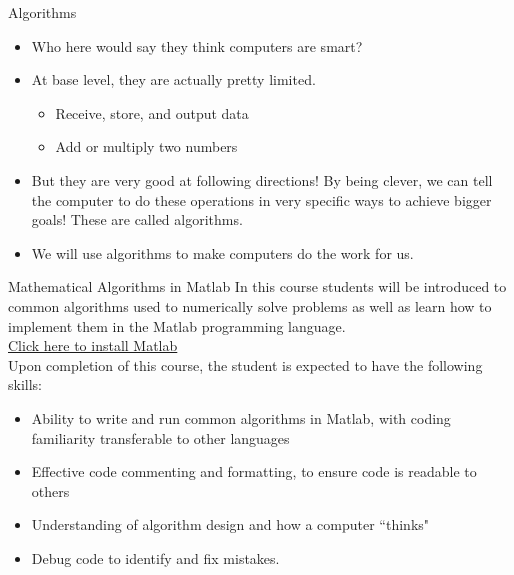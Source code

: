 {}\documentclass[letterpaper,
compress,
xcolor=x11names,
]{beamer}
\begin{document}
\begin{frame}{Algorithms}
	\footnotesize
	\begin{itemize}
		\item Who here would say they think computers are smart?
		\item<2-> At base level, they are actually pretty limited.
		\begin{itemize}
			\item Receive, store, and output data
			\item Add or multiply two numbers
		\end{itemize}
		\item<3-> But they are very good at following directions! By being clever, we can tell the computer to do these operations in very specific ways to achieve bigger goals! These are called algorithms.
		\item<4-> We will use algorithms to make computers do the work for us.
	\end{itemize}
\end{frame}
\begin{frame}{Mathematical Algorithms in Matlab}
	\footnotesize
	\noindent In this course students will be introduced to common algorithms used to numerically solve problems as well as learn how to implement them in the Matlab programming language. \\ 
	\bigskip
	\textcolor{blue}{\href{https://www.mathworks.com/academia/tah-portal/colorado-state-university-40638290.html}{Click here to install Matlab}} \\
	\bigskip
	\noindent Upon completion of this course, the student is expected to have the following skills:
	\begin{itemize}
		\item Ability to write and run common algorithms in Matlab, with coding familiarity transferable to other languages
		\item Effective code commenting and formatting, to ensure code is readable to others
		\item Understanding of algorithm design and how a computer ``thinks"
		\item Debug code to identify and fix mistakes.
	\end{itemize}	
	
\end{frame}
\end{document}
